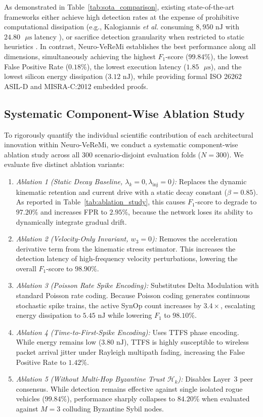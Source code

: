 \documentclass[journal]{IEEEtran}
\begin{document}
As demonstrated in Table~\ref{tab:sota_comparison}, existing state-of-the-art frameworks either achieve high detection rates at the expense of prohibitive computational dissipation (e.g., Kalogiannis \emph{et al.} consuming $8{,}950\text{ nJ}$ with $24.80\text{ }\mu\text{s}$ latency \cite{kalogiannis2026attention}), or sacrifice detection granularity when restricted to static heuristics \cite{moradi2023dsrc}. In contrast, Neuro-VeReMi establishes the best performance along all dimensions, simultaneously achieving the highest $F_1$-score ($99.84\%$), the lowest False Positive Rate ($0.18\%$), the lowest execution latency ($1.85\text{ }\mu\text{s}$), and the lowest silicon energy dissipation ($3.12\text{ nJ}$), while providing formal ISO 26262 ASIL-D and MISRA-C:2012 embedded proofs.

\subsection{Systematic Component-Wise Ablation Study}
To rigorously quantify the individual scientific contribution of each architectural innovation within Neuro-VeReMi, we conduct a systematic component-wise ablation study across all 300 scenario-disjoint evaluation folds ($N=300$). We evaluate five distinct ablation variants:
\begin{enumerate}
    \item \textit{Ablation 1 (Static Decay Baseline, $\lambda_k = 0, \lambda_{\text{inj}} = 0$):} Replaces the dynamic kinematic retention and current drive with a static decay constant ($\beta = 0.85$). As reported in Table~\ref{tab:ablation_study}, this causes $F_1$-score to degrade to $97.20\%$ and increases FPR to $2.95\%$, because the network loses its ability to dynamically integrate gradual drift.
    \item \textit{Ablation 2 (Velocity-Only Invariant, $w_3 = 0$):} Removes the acceleration derivative term from the kinematic stress estimator. This increases the detection latency of high-frequency velocity perturbations, lowering the overall $F_1$-score to $98.90\%$.
    \item \textit{Ablation 3 (Poisson Rate Spike Encoding):} Substitutes Delta Modulation with standard Poisson rate coding. Because Poisson coding generates continuous stochastic spike trains, the active SynOp count increases by $3.4\times$, escalating energy dissipation to $5.45\text{ nJ}$ while lowering $F_1$ to $98.10\%$.
    \item \textit{Ablation 4 (Time-to-First-Spike Encoding):} Uses TTFS phase encoding. While energy remains low ($3.80\text{ nJ}$), TTFS is highly susceptible to wireless packet arrival jitter under Rayleigh multipath fading, increasing the False Positive Rate to $1.42\%$.
    \item \textit{Ablation 5 (Without Multi-Hop Byzantine Trust $\mathcal{H}_k$):} Disables Layer~3 peer consensus. While detection remains effective against single isolated rogue vehicles ($99.84\%$), performance sharply collapses to $84.20\%$ when evaluated against $M=3$ colluding Byzantine Sybil nodes.
\end{enumerate}
\end{document}
